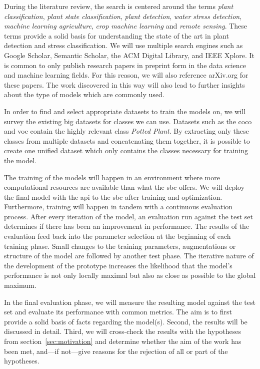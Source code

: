 \documentclass[draft,final]{vutinfth} %
\begin{document}
During the literature review, the search is centered around the terms
\emph{plant classification}, \emph{plant state classification},
\emph{plant detection}, \emph{water stress detection}, \emph{machine
learning agriculture}, \emph{crop machine learning} and \emph{remote
sensing}. These terms provide a solid basis for understanding the
state of the art in plant detection and stress classification. We will
use multiple search engines such as Google Scholar, Semantic Scholar,
the ACM Digital Library, and IEEE Xplore. It is common to only publish
research papers in preprint form in the data science and machine
learning fields. For this reason, we will also reference arXiv.org for
these papers. The work discovered in this way will also lead to
further insights about the type of models which are commonly used.

In order to find and select appropriate datasets to train the models
on, we will survey the existing big datasets for classes we can
use. Datasets such as the \gls{coco} \cite{lin2015} and
\gls{voc} \cite{everingham2010} contain the highly relevant class
\emph{Potted Plant}. By extracting only these classes from multiple
datasets and concatenating them together, it is possible to create one
unified dataset which only contains the classes necessary for training
the model.

The training of the models will happen in an environment where more
computational resources are available than what the \gls{sbc}
offers. We will deploy the final model with the \gls{api} to the
\gls{sbc} after training and optimization. Furthermore, training will
happen in tandem with a continuous evaluation process. After every
iteration of the model, an evaluation run against the test set
determines if there has been an improvement in performance. The
results of the evaluation feed back into the parameter selection at
the beginning of each training phase. Small changes to the training
parameters, augmentations or structure of the model are followed by
another test phase. The iterative nature of the development of the
prototype increases the likelihood that the model's performance is not
only locally maximal but also as close as possible to the global
maximum.

In the final evaluation phase, we will measure the resulting model
against the test set and evaluate its performance with common
metrics. The aim is to first provide a solid basis of facts regarding
the model(s). Second, the results will be discussed in detail. Third,
we will cross-check the results with the hypotheses from
section~\ref{sec:motivation} and determine whether the aim of the work
has been met, and—if not—give reasons for the rejection of all or part
of the hypotheses.
\end{document}
